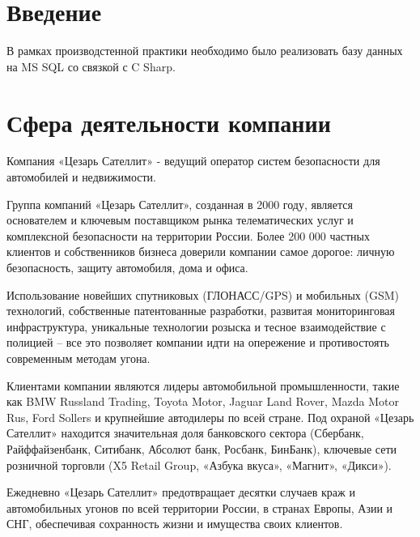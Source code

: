 \newpage

\section{Введение}

\vspace{0.5cm}
\hspace{0.6cm}
В рамках производстенной практики необходимо было реализовать базу данных на MS SQL со связкой с C Sharp. 

\section{Сфера деятельности компании}

\vspace{0.5cm}
\hspace{0.6cm}
Компания «Цезарь Сателлит» - ведущий оператор систем безопасности для автомобилей и недвижимости.

\vspace{0.1cm}
Группа компаний «Цезарь Сателлит», созданная в 2000 году, является основателем и ключевым поставщиком рынка телематических услуг и комплексной безопасности на территории России. Более 200 000 частных клиентов и собственников бизнеса доверили компании самое дорогое: личную безопасность, защиту автомобиля, дома и офиса.

\vspace{0.1cm}
Использование новейших спутниковых (ГЛОНАСС/GPS) и мобильных (GSM) технологий, собственные патентованные разработки, развитая мониторинговая инфраструктура, уникальные технологии розыска и тесное взаимодействие с полицией – все это позволяет компании идти на опережение и противостоять современным методам угона.

\vspace{0.1cm}
Клиентами компании являются лидеры автомобильной промышленности, такие как BMW Russland Trading, Toyota Motor, Jaguar Land Rover, Mazda Motor Rus, Ford Sollers и крупнейшие автодилеры по всей стране. Под охраной «Цезарь Сателлит» находится значительная доля банковского сектора (Сбербанк, Райффайзенбанк, Ситибанк, Абсолют банк, Росбанк, БинБанк), ключевые сети розничной торговли (X5 Retail Group, «Азбука вкуса», «Магнит», «Дикси»).

\vspace{0.1cm}
Ежедневно «Цезарь Сателлит» предотвращает десятки случаев краж и автомобильных угонов по всей территории России, в странах Европы, Азии и СНГ, обеспечивая сохранность жизни и имущества своих клиентов\cite{csat}.


